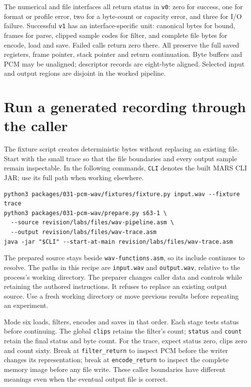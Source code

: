 The numerical and file interfaces all return status in \texttt{v0}: zero for
success, one for format or profile error, two for a byte-count or capacity
error, and three for I/O failure. Successful \texttt{v1} has an interface-specific
unit: canonical bytes for bound, frames for parse, clipped sample codes for
filter, and complete file bytes for encode, load and save. Failed calls return
zero there. All preserve the full saved registers, frame pointer, stack pointer
and return continuation. Byte buffers and PCM may be unaligned; descriptor
records are eight-byte aligned. Selected input and output regions are disjoint
in the worked pipeline.

\section{Run a generated recording through the caller}

The fixture script creates deterministic bytes without replacing an existing
file. Start with the small trace so that the file boundaries and every output
sample remain inspectable. In the following commands, \texttt{CLI} denotes the
built MARS CLI JAR; use its full path when working elsewhere.
\begin{Verbatim}
python3 packages/031-pcm-wav/fixtures/fixture.py input.wav --fixture trace
python3 packages/031-pcm-wav/prepare.py s63-1 \
  --source revision/labs/files/wav-pipeline.asm \
  --output revision/labs/files/wav-trace.asm
java -jar "$CLI" --start-at-main revision/labs/files/wav-trace.asm
\end{Verbatim}
The prepared source stays beside \texttt{wav-functions.asm}, so its include
continues to resolve. The paths in this recipe are \texttt{input.wav} and
\texttt{output.wav}, relative to the process's working directory. The preparer
changes caller data and controls while retaining the authored instructions.
It refuses to replace an existing output source. Use a fresh working directory
or move previous results before repeating an experiment.

Mode six loads, filters, encodes and saves in that order. Each stage tests
status before continuing. The global \texttt{clips} retains the filter's count;
\texttt{status} and \texttt{count} retain the final status and byte count.
For the trace, expect status zero, clips zero and count sixty. Break at
\texttt{filter\_return} to inspect PCM before the writer changes its
representation; break at \texttt{encode\_return} to inspect the complete
memory image before any file write. These caller boundaries have different
meanings even when the eventual output file is correct.

